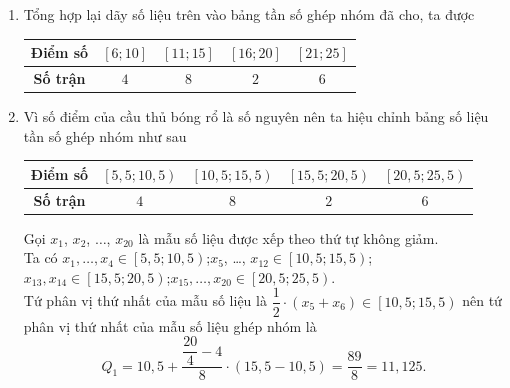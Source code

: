 \begin{bt}[Mức độ 2]
{\begin{enumerate}
\begin{center}
\begin{tabular}{|c|c|c|c|c|c|c|c|c|c|}
					\hline 
					$ 14 $	& $ 15 $ & $ 18 $ & $ 18 $ & $ 21 $ & $ 22 $ & $ 23 $ & $ 24 $ & $ 25 $ & $ 25 $\\
					\hline 
				\end{tabular} 
			\end{center}
			Tứ phân vị thứ nhất của mẫu số liệu là $\dfrac{1}{2}\cdot\left( x_{5}+x_6\right) =\dfrac{1}{2}\cdot\left( 11+11\right)=11$.\\
			Tứ phân vị thứ hai của mẫu số liệu là $\dfrac{1}{2}\cdot\left( x_{10}+x_{11}\right)=\dfrac{1}{2}\cdot\left( 14+14\right)=14$.\\
			Tứ phân vị thứ ba của mẫu số liệu là $\dfrac{1}{2}\cdot\left( x_{15}+x_{16}\right)=\dfrac{1}{2}\cdot\left( 21+22\right)=21{,}5$.
			\item Tổng hợp lại dãy số liệu trên vào bảng tần số ghép nhóm đã cho, ta được
			\begin{center}
				\begin{tabular}{|c|c|c|c|c|}
					\hline 
					\textbf{Điểm số}	& $\left[ 6;10\right] $ & $\left[ 11;15\right] $ & $\left[16;20\right] $ & $\left[ 21;25\right] $\\ 
					\hline 
					\textbf{Số trận}	& $ 4 $ & $ 8 $ & $ 2 $ & $ 6 $\\ 
					\hline 
				\end{tabular} 
			\end{center}
			\item Vì số điểm của cầu thủ bóng rổ là số nguyên nên ta hiệu chỉnh bảng số liệu tần số ghép nhóm như sau
			\begin{center}
				\begin{tabular}{|c|c|c|c|c|}
					\hline 
					\textbf{Điểm số}	& $\left[ 5{,}5;10{,}5\right) $ & $\left[ 10{,}5;15{,}5\right) $ & $\left[15{,}5;20{,}5\right) $ & $\left[ 20{,}5;25{,}5\right) $\\ 
					\hline 
					\textbf{Số trận}	& $ 4 $ & $ 8 $ & $ 2 $ & $ 6 $\\ 
					\hline 
				\end{tabular} 
			\end{center}
			Gọi $ x_1 $, $ x_2 $, $\ldots $, $ x_{20} $ là mẫu số liệu được xếp theo thứ tự không giảm.\\
			Ta có $ x_1,\ldots, x_4\in \left[ 5{,}5;10{,}5\right) $;$ x_5$, \ldots, $x_{12}\in \left[ 10{,}5;15{,}5\right)$;$ x_{13}, x_{14}\in \left[15{,}5;20{,}5\right) $;$ x_{15},\ldots, x_{20}\in \left[ 20{,}5;25{,}5\right) $.\\
			Tứ phân vị thứ nhất của mẫu số liệu là $\dfrac{1}{2}\cdot\left( x_{5}+x_6\right)\in\left[ 10{,}5;15{,}5\right)$ nên tứ phân vị thứ nhất của mẫu số liệu ghép nhóm là $$Q_1=10{,}5 +\dfrac{\dfrac{20}{4}-4}{8}\cdot\left(15{,}5-10{,}5\right)=\dfrac{89}{8}=11{,}125.$$

\end{enumerate}}
\end{bt}
